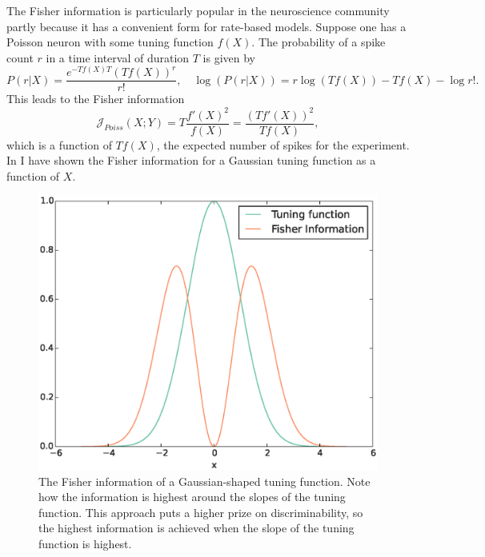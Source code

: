 The Fisher information is particularly popular in the neuroscience community partly because it has a convenient form for rate-based models. Suppose one has a Poisson neuron
with some tuning function $f(X)$. The probability of a spike count $r$ in a time interval of duration $T$ is given by
\[
P(r|X) = \frac{e^{-T f(X)T}(T f(X))^r}{r!}, \quad \log(P(r|X)) = r \log (T f(X)) - T f(X) - \log r!.
\]
This leads to the Fisher information
\[
\mathcal{J}_{Poiss} (X;Y) = T \frac{f'(X)^2}{f(X)} = \frac{(T f'(X))^2}{T f(X)},
\]
which is a function of $T f(X)$, the expected number of spikes for the experiment. In  I have shown the Fisher
information for a Gaussian tuning function as a function of $X$.

\begin{figure}
\includegraphics[width=\columnwidth]{figures/figure_3_5.eps}
\caption[Fisher Information for a Gauss-Poisson neuron.]{The Fisher information of a Gaussian-shaped tuning function. Note how the information is highest around the slopes of the tuning function. This approach
puts a higher prize on discriminability, so the highest information is achieved when the slope of the tuning function is highest.}
\label{fig:fisher_info}
\end{figure}

